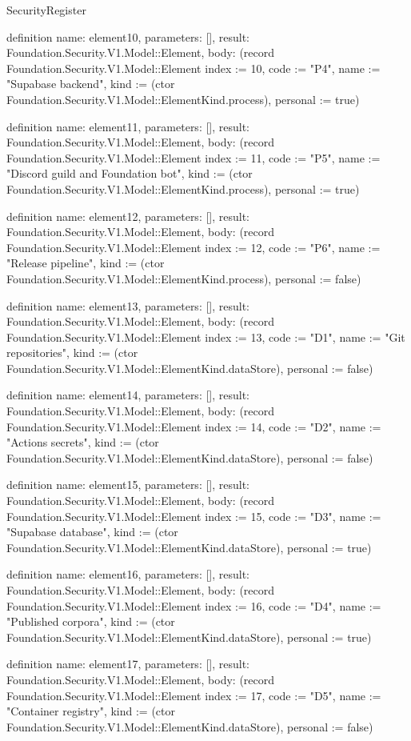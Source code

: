 \begin{lexlean}{SecurityRegister}
\begin{semanticmodule}
definition{
  name: element10,
  parameters: [],
  result: Foundation.Security.V1.Model::Element,
  body: (record Foundation.Security.V1.Model::Element {index := 10, code := "P4", name := "Supabase backend", kind := (ctor Foundation.Security.V1.Model::ElementKind.process), personal := true})
}

definition{
  name: element11,
  parameters: [],
  result: Foundation.Security.V1.Model::Element,
  body: (record Foundation.Security.V1.Model::Element {index := 11, code := "P5", name := "Discord guild and Foundation bot", kind := (ctor Foundation.Security.V1.Model::ElementKind.process), personal := true})
}

definition{
  name: element12,
  parameters: [],
  result: Foundation.Security.V1.Model::Element,
  body: (record Foundation.Security.V1.Model::Element {index := 12, code := "P6", name := "Release pipeline", kind := (ctor Foundation.Security.V1.Model::ElementKind.process), personal := false})
}

definition{
  name: element13,
  parameters: [],
  result: Foundation.Security.V1.Model::Element,
  body: (record Foundation.Security.V1.Model::Element {index := 13, code := "D1", name := "Git repositories", kind := (ctor Foundation.Security.V1.Model::ElementKind.dataStore), personal := false})
}

definition{
  name: element14,
  parameters: [],
  result: Foundation.Security.V1.Model::Element,
  body: (record Foundation.Security.V1.Model::Element {index := 14, code := "D2", name := "Actions secrets", kind := (ctor Foundation.Security.V1.Model::ElementKind.dataStore), personal := false})
}

definition{
  name: element15,
  parameters: [],
  result: Foundation.Security.V1.Model::Element,
  body: (record Foundation.Security.V1.Model::Element {index := 15, code := "D3", name := "Supabase database", kind := (ctor Foundation.Security.V1.Model::ElementKind.dataStore), personal := true})
}

definition{
  name: element16,
  parameters: [],
  result: Foundation.Security.V1.Model::Element,
  body: (record Foundation.Security.V1.Model::Element {index := 16, code := "D4", name := "Published corpora", kind := (ctor Foundation.Security.V1.Model::ElementKind.dataStore), personal := true})
}

definition{
  name: element17,
  parameters: [],
  result: Foundation.Security.V1.Model::Element,
  body: (record Foundation.Security.V1.Model::Element {index := 17, code := "D5", name := "Container registry", kind := (ctor Foundation.Security.V1.Model::ElementKind.dataStore), personal := false})
}


\end{semanticmodule}
\end{lexlean}

